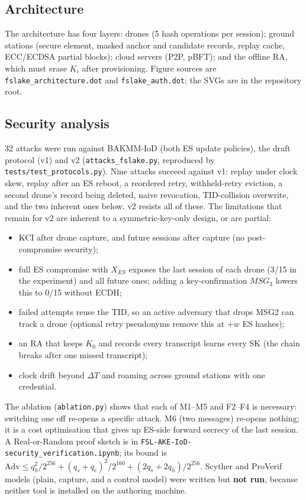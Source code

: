 \subsection{Architecture}
\label{subsec:w3-arch}

The architecture has four layers: drones (5 hash operations per session); ground stations (secure element, masked
anchor and candidate records, replay cache, ECC/ECDSA partial blocks); cloud servers (P2P, pBFT); and the offline RA,
which must erase $K_i$ after provisioning. Figure sources are \texttt{fslake\_architecture.dot} and
\texttt{fslake\_auth.dot}; the SVGs are in the repository root.

\subsection{Security analysis}
\label{subsec:w3-security}

32 attacks were run against BAKMM-IoD (both ES update policies), the draft protocol (v1) and v2
(\texttt{attacks\_fslake.py}, reproduced by \texttt{tests/test\_protocols.py}). Nine attacks succeed against v1:
replay under clock skew, replay after an ES reboot, a reordered retry, withheld-retry eviction, a second drone's
record being deleted, naive revocation, TID-collision overwrite, and the two inherent ones below. v2 resists all of
these. The limitations that remain for v2 are inherent to a symmetric-key-only design, or are partial:
\begin{itemize}
\item KCI after drone capture, and future sessions after capture (no post-compromise security);
\item full ES compromise with $X_{ES}$ exposes the last session of each drone (3/15 in the experiment) and all future ones;
      adding a key-confirmation $MSG_3$ lowers this to 0/15 without ECDH;
\item failed attempts reuse the TID, so an active adversary that drops MSG2 can track a drone (optional retry pseudonyms remove this at $+w$ ES hashes);
\item an RA that keeps $K_0$ and records every transcript learns every SK (the chain breaks after one missed transcript);
\item clock drift beyond $\Delta T$ and roaming across ground stations with one credential.
\end{itemize}
The ablation (\texttt{ablation.py}) shows that each of M1--M5 and F2--F4 is necessary: switching one off re-opens a
specific attack. M6 (two messages) re-opens nothing; it is a cost optimisation that gives up ES-side forward secrecy
of the last session.
A Real-or-Random proof sketch is in \texttt{FSL-AKE-IoD-security\_verification.ipynb}; its bound is
$\mathrm{Adv}\le q_h^2/2^{256}+(q_s+q_e)^2/2^{160}+(2q_s+2q_h)/2^{256}$.
Scyther and ProVerif models (plain, capture, and a control model) were written but \textbf{not run}, because
neither tool is installed on the authoring machine.

